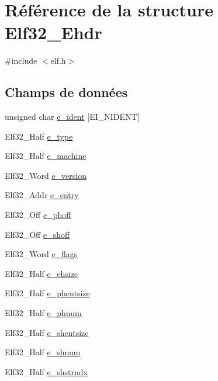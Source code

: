 \hypertarget{structElf32__Ehdr}{\section{Référence de la structure Elf32\+\_\+\+Ehdr}
\label{structElf32__Ehdr}
}


{\ttfamily \#include $<$elf.\+h$>$}

\subsection*{Champs de données}
\begin{DoxyCompactItemize}
\item 
unsigned char \hyperlink{structElf32__Ehdr_aba47ac5e0af02d5668782f1fd5a7466c}{e\+\_\+ident} \mbox{[}E\+I\+\_\+\+N\+I\+D\+E\+N\+T\mbox{]}
\item 
Elf32\+\_\+\+Half \hyperlink{structElf32__Ehdr_a49e40a791813c06e3b6ebcb53aef1bb8}{e\+\_\+type}
\item 
Elf32\+\_\+\+Half \hyperlink{structElf32__Ehdr_a19bca7faba9e5573814643efc3574c7b}{e\+\_\+machine}
\item 
Elf32\+\_\+\+Word \hyperlink{structElf32__Ehdr_aa27627bda53281221325df4dd782e800}{e\+\_\+version}
\item 
Elf32\+\_\+\+Addr \hyperlink{structElf32__Ehdr_ab8a982696048d807017919b7d0145482}{e\+\_\+entry}
\item 
Elf32\+\_\+\+Off \hyperlink{structElf32__Ehdr_a25c36fc010284a928604aae005b67ad1}{e\+\_\+phoff}
\item 
Elf32\+\_\+\+Off \hyperlink{structElf32__Ehdr_a00601af5187a1b3f8babfe9cddd95c15}{e\+\_\+shoff}
\item 
Elf32\+\_\+\+Word \hyperlink{structElf32__Ehdr_a87cf481be7917fafde0c4ecf78c8e574}{e\+\_\+flags}
\item 
Elf32\+\_\+\+Half \hyperlink{structElf32__Ehdr_a04c658023e50479eed64f6d1b00a2504}{e\+\_\+ehsize}
\item 
Elf32\+\_\+\+Half \hyperlink{structElf32__Ehdr_afa2289f96d86fcc568a3b1f40cc8953e}{e\+\_\+phentsize}
\item 
Elf32\+\_\+\+Half \hyperlink{structElf32__Ehdr_a360898812db1655f8cb8258780d9df5b}{e\+\_\+phnum}
\item 
Elf32\+\_\+\+Half \hyperlink{structElf32__Ehdr_ab53c709a841960e499da68e2316ed428}{e\+\_\+shentsize}
\item 
Elf32\+\_\+\+Half \hyperlink{structElf32__Ehdr_a11249bd7e61642742a68a3e7f69ac721}{e\+\_\+shnum}
\item 
Elf32\+\_\+\+Half \hyperlink{structElf32__Ehdr_a3b3070ccd7d971e8cb6ea58d4c6fab09}{e\+\_\+shstrndx}
\end{DoxyCompactItemize}


